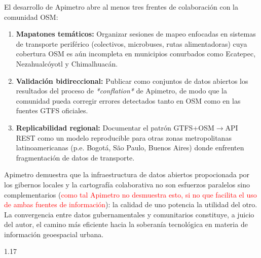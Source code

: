\documentclass{isprs} %
\begin{document}
El desarrollo de Apimetro abre al menos tres frentes de colaboración con la comunidad OSM:

\begin{enumerate}[nosep, leftmargin=1.5em]
\item \textbf{Mapatones temáticos:}  Organizar sesiones de mapeo enfocadas en sistemas de transporte periférico (colectivos, microbuses, rutas alimentadoras) cuya cobertura OSM es aún incompleta en municipios conurbados como Ecatepec, Nezahualcóyotl y Chimalhuacán.
\item \textbf{Validación bidireccional:}  Publicar como conjuntos de datos abiertos los resultados del proceso de \textit{*conflation*} de Apimetro, de modo que la comunidad pueda corregir errores detectados tanto en OSM como en las fuentes GTFS oficiales.
\item \textbf{Replicabilidad regional:}  Documentar el patrón GTFS+OSM$\to$API REST como un modelo reproducible para otras zonas metropolitanas latinoamericanas (p.e. Bogotá, São Paulo, Buenos Aires) donde enfrenten fragmentación de datos de transporte.
\end{enumerate}

Apimetro demuestra que la infraestructura de datos abiertos propocionada por los gibernos locales y la cartografía colaborativa no son esfuerzos paralelos sino complementarios (\textcolor{red}{como tal Apimetro no desmuestra esto, si no que facilita el uso de ambas fuentes de información}): la calidad de uno potencia la utilidad del otro. La convergencia entre datos gubernamentales y comunitarios constituye, a juicio del autor, el camino más eficiente hacia la soberanía tecnológica en materia de información geoespacial urbana.

{
\begin{spacing}{1.17}
\normalsize

\end{spacing}
}
\end{document}
